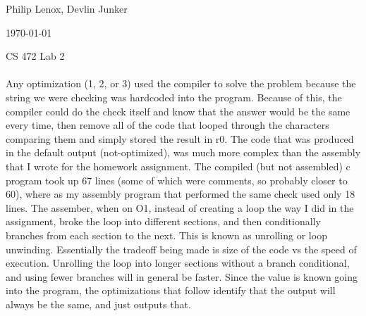 \documentclass[letterpaper,10pt,titlepage]{article}
\def\name{Philip Lenox, Devlin Junker}
\begin{document}
\hfill \name

\hfill \today

\hfill CS 472 Lab 2
\\
\\
Any optimization (1, 2, or 3) used the compiler to solve the problem because the string we were checking was hardcoded into the program. Because of this, the compiler could do the check itself and know that the answer would be the same every time, then remove all of the code that looped through the characters comparing them and simply stored the result in r0. The code that was produced in the default output (not-optimized), was much more complex than the assembly that I wrote for the homework assignment. The compiled (but not assembled) c program took up 67 lines (some of which were comments, so probably closer to 60), where as my assembly program that performed the same check used only 18 lines. The assember, when on O1, instead of creating a loop the way I did in the assignment, broke the loop into different sections, and then conditionally branches from each section to the next. This is known as unrolling or loop unwinding. Essentially the tradeoff being made is size of the code vs the speed of execution. Unrolling the loop into longer sections without a branch conditional, and using fewer branches will in general be faster. Since the value is known going into the program, the optimizations that follow identify that the output will always be the same, and just outputs that.
\end{document}
